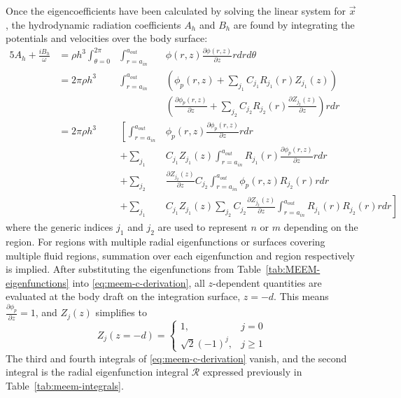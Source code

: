 \begin{appendices}
Once the eigencoefficients have been calculated by solving the linear system for $\vec{x}$, the hydrodynamic radiation coefficients $A_h$ and $B_h$ are found by integrating the potentials and velocities over the body surface:
\begin{alignat}{5}\label{eq:meem-c-derivation}
    A_h + \frac{iB_h}{\omega}&=\rho h^3  \int_{\theta=0}^{2\pi} & \int_{r=a_{in}}^{a_{out}} &\phi(r,z) \frac{\partial \phi(r,z)}{\partial z}r dr d\theta  \nonumber \\
    &= 2\pi \rho h^3 & \int_{r=a_{in}}^{a_{out}}&
   \left(\phi_p(r,z) + \sum_{j_1} C_{j_1} R_{j_1}(r)Z_{j_1}(z)\right) \nonumber \\
  & & &  \left(\frac{\partial \phi_p(r,z)}{\partial z} + \sum_{j_2} C_{j_2} R_{j_2}(r)\frac{\partial Z_{j_2}(z)}{\partial z} \right)r dr \nonumber \\
    &= 2\pi \rho h^3 & \left[
    \int_{r=a_{in}}^{a_{out}} \right. & \left.\phi_p(r,z)\frac{\partial \phi_p(r,z)}{\partial z} rdr  \right.
\\
   & &  + \sum_{j_1} &C_{j_1} Z_{j_1}(z)\int_{r=a_{in}}^{a_{out}}R_{j_1}(r)\frac{\partial \phi_p(r,z)}{\partial z}rdr \nonumber \\
    &&   + \sum_{j_2}& \frac{\partial Z_{j_2}(z)}{\partial z} C_{j_2}\int_{r=a_{in}}^{a_{out}}\phi_p(r,z)  R_{j_2}(r)rdr \nonumber \\
   & & +  \sum_{j_1}& \left.
C_{j_1}Z_{j_1}(z) \sum_{j_2} C_{j_2} \frac{\partial Z_{j_2}(z)}{\partial z}\int_{r=a_{in}}^{a_{out}} R_{j_1}(r)R_{j_2}(r)rdr\right] \nonumber
\end{alignat}
where the generic indices $j_1$ and $j_2$ are used to represent $n$ or $m$ depending on the region.
For regions with multiple radial eigenfunctions or surfaces covering multiple fluid regions, summation over each eigenfunction and region respectively is implied.
After substituting the eigenfunctions from Table~\ref{tab:MEEM-eigenfunctions} into \ref{eq:meem-c-derivation}, all $z$-dependent quantities are evaluated at the body draft on the integration surface, $z=-d$.
This means $\frac{\partial \phi_p}{\partial z}=1$, and $Z_j(z)$ simplifies to
\begin{equation}
    Z_j(z=-d) = \begin{cases}1,& j=0\\ \sqrt2(-1)^j,& j \geq 1\end{cases}
\end{equation}
The third and fourth integrals of \ref{eq:meem-c-derivation} vanish, and the second integral is the radial eigenfunction integral $\boldsymbol{\mathcal{R}}$ expressed previously in Table~\ref{tab:meem-integrals}. 


\end{appendices}
